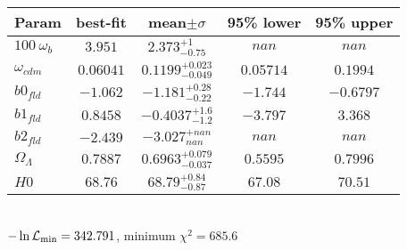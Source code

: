 \begin{tabular}{|l|c|c|c|c|} 
 \hline 
Param & best-fit & mean$\pm\sigma$ & 95\% lower & 95\% upper \\ \hline 
$100~\omega_{b }$ &$3.951$ & $2.373_{-0.75}^{+1}$ & $nan$ & $nan$ \\ 
$\omega_{cdm }$ &$0.06041$ & $0.1199_{-0.049}^{+0.023}$ & $0.05714$ & $0.1994$ \\ 
$b0_{fld }$ &$-1.062$ & $-1.181_{-0.22}^{+0.28}$ & $-1.744$ & $-0.6797$ \\ 
$b1_{fld }$ &$0.8458$ & $-0.4037_{-1.2}^{+1.6}$ & $-3.797$ & $3.368$ \\ 
$b2_{fld }$ &$-2.439$ & $-3.027_{nan}^{+nan}$ & $nan$ & $nan$ \\ 
$\Omega_{\Lambda }$ &$0.7887$ & $0.6963_{-0.037}^{+0.079}$ & $0.5595$ & $0.7996$ \\ 
$H0$ &$68.76$ & $68.79_{-0.87}^{+0.84}$ & $67.08$ & $70.51$ \\ 
\hline 
 \end{tabular} \\ 
$-\ln{\cal L}_\mathrm{min} =342.791$, minimum $\chi^2=685.6$ \\ 

